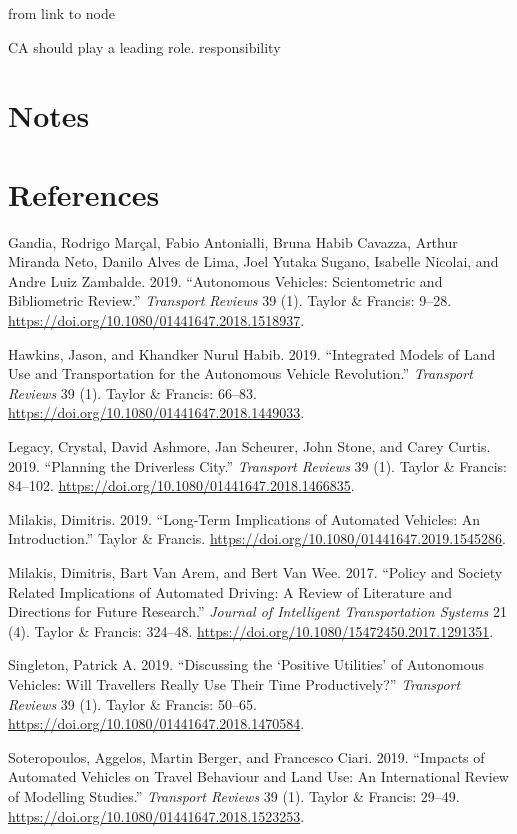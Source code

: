 \documentclass[12pt,]{article}
\begin{document}
from link to node

CA should play a leading role. responsibility

\hypertarget{notes}{%
\section{Notes}\label{notes}}

\hypertarget{references}{%
\section*{References}\label{references}}

\hypertarget{refs}{}
\leavevmode\hypertarget{ref-gandia2019autonomous}{}%
Gandia, Rodrigo Marçal, Fabio Antonialli, Bruna Habib Cavazza, Arthur
Miranda Neto, Danilo Alves de Lima, Joel Yutaka Sugano, Isabelle
Nicolai, and Andre Luiz Zambalde. 2019. ``Autonomous Vehicles:
Scientometric and Bibliometric Review.'' \emph{Transport Reviews} 39
(1). Taylor \& Francis: 9--28.
\url{https://doi.org/10.1080/01441647.2018.1518937}.

\leavevmode\hypertarget{ref-hawkins2019integrated}{}%
Hawkins, Jason, and Khandker Nurul Habib. 2019. ``Integrated Models of
Land Use and Transportation for the Autonomous Vehicle Revolution.''
\emph{Transport Reviews} 39 (1). Taylor \& Francis: 66--83.
\url{https://doi.org/10.1080/01441647.2018.1449033}.

\leavevmode\hypertarget{ref-legacy2019planning}{}%
Legacy, Crystal, David Ashmore, Jan Scheurer, John Stone, and Carey
Curtis. 2019. ``Planning the Driverless City.'' \emph{Transport Reviews}
39 (1). Taylor \& Francis: 84--102.
\url{https://doi.org/10.1080/01441647.2018.1466835}.

\leavevmode\hypertarget{ref-milakis2019long}{}%
Milakis, Dimitris. 2019. ``Long-Term Implications of Automated Vehicles:
An Introduction.'' Taylor \& Francis.
\url{https://doi.org/10.1080/01441647.2019.1545286}.

\leavevmode\hypertarget{ref-milakis2017policy}{}%
Milakis, Dimitris, Bart Van Arem, and Bert Van Wee. 2017. ``Policy and
Society Related Implications of Automated Driving: A Review of
Literature and Directions for Future Research.'' \emph{Journal of
Intelligent Transportation Systems} 21 (4). Taylor \& Francis: 324--48.
\url{https://doi.org/10.1080/15472450.2017.1291351}.

\leavevmode\hypertarget{ref-singleton2019discussing}{}%
Singleton, Patrick A. 2019. ``Discussing the `Positive Utilities' of
Autonomous Vehicles: Will Travellers Really Use Their Time
Productively?'' \emph{Transport Reviews} 39 (1). Taylor \& Francis:
50--65. \url{https://doi.org/10.1080/01441647.2018.1470584}.

\leavevmode\hypertarget{ref-soteropoulos2019impacts}{}%
Soteropoulos, Aggelos, Martin Berger, and Francesco Ciari. 2019.
``Impacts of Automated Vehicles on Travel Behaviour and Land Use: An
International Review of Modelling Studies.'' \emph{Transport Reviews} 39
(1). Taylor \& Francis: 29--49.
\url{https://doi.org/10.1080/01441647.2018.1523253}.
\end{document}
